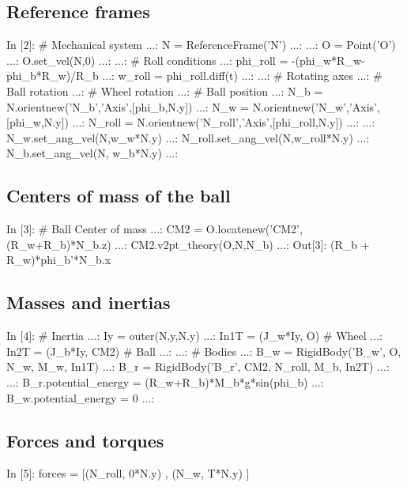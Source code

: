 \subsection{Reference frames}
\begin{code}
In [2]: # Mechanical system
   ...: N = ReferenceFrame('N')
   ...: 
   ...: O = Point('O')
   ...: O.set_vel(N,0)
   ...: 
   ...: # Roll conditions
   ...: phi_roll = -(phi_w*R_w-phi_b*R_w)/R_b
   ...: w_roll = phi_roll.diff(t)
   ...: 
   ...: # Rotating axes
   ...: # Ball rotation
   ...: # Wheel rotation
   ...: # Ball position
   ...: N_b = N.orientnew('N_b','Axis',[phi_b,N.y])
   ...: N_w = N.orientnew('N_w','Axis',[phi_w,N.y])
   ...: N_roll = N.orientnew('N_roll','Axis',[phi_roll,N.y])
   ...: 
   ...: N_w.set_ang_vel(N,w_w*N.y)
   ...: N_roll.set_ang_vel(N,w_roll*N.y)
   ...: N_b.set_ang_vel(N, w_b*N.y)
   ...: 
\end{code}

\subsection{Centers of mass of the ball}
\begin{code}
In [3]: # Ball Center of mass
   ...: CM2 = O.locatenew('CM2',(R_w+R_b)*N_b.z)
   ...: CM2.v2pt_theory(O,N,N_b)
   ...: 
Out[3]: (R_b + R_w)*phi_b'*N_b.x
\end{code}

\subsection{Masses and inertias}
\begin{code}
In [4]: # Inertia
   ...: Iy = outer(N.y,N.y)
   ...: In1T = (J_w*Iy, O)       # Wheel
   ...: In2T = (J_b*Iy, CM2)   # Ball
   ...: 
   ...: # Bodies
   ...: B_w = RigidBody('B_w', O, N_w, M_w, In1T)
   ...: B_r = RigidBody('B_r', CM2, N_roll, M_b, In2T)
   ...: 
   ...: B_r.potential_energy = (R_w+R_b)*M_b*g*sin(phi_b)
   ...: B_w.potential_energy = 0
   ...: 
\end{code}

\subsection{Forces and torques}
\begin{code}
In [5]: forces = [(N_roll, 0*N.y) , (N_w, T*N.y) ]
\end{code}

